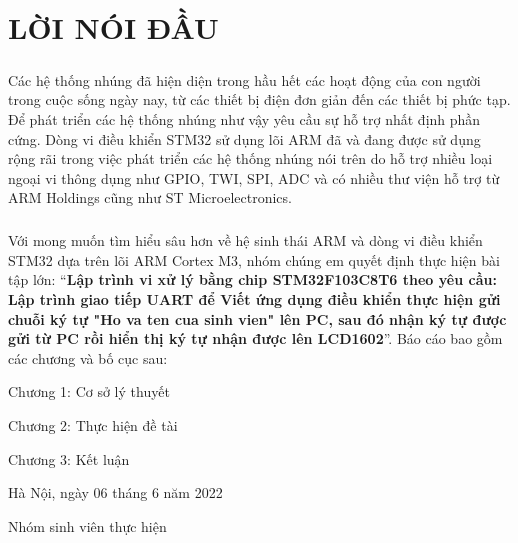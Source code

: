
\chapter*{\hfill LỜI NÓI ĐẦU \hfill}
{}

\paragraph{}
Các hệ thống nhúng đã hiện diện trong hầu hết các hoạt động của con người trong cuộc sống ngày nay, từ các thiết bị điện đơn giản đến các thiết bị phức tạp. Để phát triển các hệ thống nhúng như vậy yêu cầu sự hỗ trợ nhất định phần cứng. Dòng vi điều khiển STM32 sử dụng lõi ARM đã và đang được sử dụng rộng rãi trong việc phát triển các hệ thống nhúng nói trên do hỗ trợ nhiều loại ngoại vi thông dụng như GPIO, TWI, SPI, ADC và có nhiều thư viện hỗ trợ từ ARM Holdings cũng như ST Microelectronics.

\paragraph{}
Với mong muốn tìm hiểu sâu hơn về hệ sinh thái ARM và dòng vi điều khiển STM32 dựa trên lõi ARM Cortex M3, nhóm chúng em quyết định thực hiện bài tập lớn: “\textbf{Lập trình vi xử lý bằng chip STM32F103C8T6 theo yêu cầu: Lập trình giao tiếp UART để Viết ứng dụng điều khiển thực hiện gửi chuỗi ký tự "Ho va ten cua sinh vien" lên PC, sau đó nhận ký tự được gửi từ PC rồi hiển thị ký tự nhận được lên LCD1602}”. Báo cáo bao gồm các chương và bố cục sau:

\hspace{1cm}Chương 1: Cơ sở lý thuyết

\hspace{1cm}Chương 2: Thực hiện đề tài

\hspace{1cm}Chương 3: Kết luận

\vspace{1cm}

\hspace{6cm}Hà Nội, ngày 06 tháng 6 năm 2022

\vspace{2cm}

\hspace{7cm}Nhóm sinh viên thực hiện

